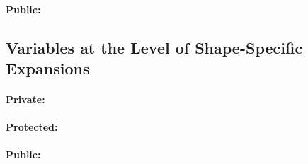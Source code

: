 \paragraph{Public:}


\subsection{Variables at the Level of Shape-Specific Expansions}

\paragraph{Private:}

\paragraph{Protected:}

\paragraph{Public:}

